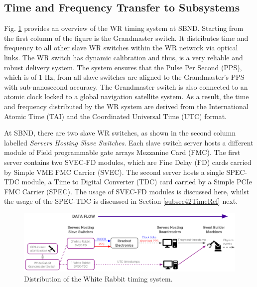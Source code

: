 

\subsection{Time and Frequency Transfer to Subsystems}
\label{subsec41TimeRef}

Fig. \ref{fig:timeTransfer} provides an overview of the WR timing system at SBND.
Starting from the first column of the figure is the Grandmaster switch.
It distributes time and frequency to all other slave WR switches within the WR network via optical links.
The WR switch has dynamic calibration and thus, is a very reliable and robust delivery system.
The system ensures that the Pulse Per Second (PPS), which is of 1 Hz, from all slave switches are aligned to the Grandmaster's PPS with sub-nanosecond accuracy.
The Grandmaster switch is also connected to an atomic clock locked to a global navigation satellite system.
As a result, the time and frequency distributed by the WR system are derived from the International Atomic Time (TAI) and the Coordinated Universal Time (UTC) format.

At SBND, there are two slave WR switches, as shown in the second column labelled \textit{Servers Hosting Slave Switches}.
Each slave switch server hosts a different module of Field programmable gate arrays Mezzanine Card (FMC).
The first server contains two SVEC-FD modules, which are Fine Delay (FD) cards carried by Simple VME FMC Carrier (SVEC).
The second server hosts a single SPEC-TDC module, a Time to Digital Converter (TDC) card carried by a Simple PCIe FMC Carrier (SPEC).
The usage of SVEC-FD modules is discussed here, whilst the usage of the SPEC-TDC is discussed in Section \ref{subsec42TimeRef} next.

\begin{figure}[b!] 
\centering    
\includegraphics[width=1.0\textwidth]{time_transfer}
\caption[White Rabbit Timing System Distribution]{
Distribution of the White Rabbit timing system.
}
\label{fig:timeTransfer}
\end{figure}

